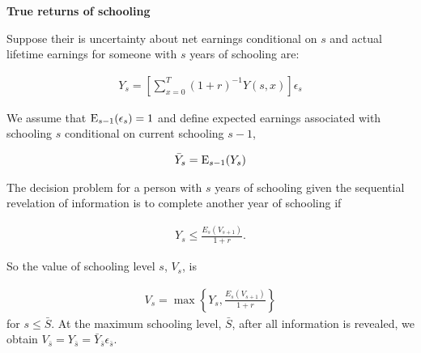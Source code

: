 \begin{frame}\begin{center}
		\LARGE\textbf{True returns of schooling}
\end{center}\end{frame}
\begin{frame}
Suppose their is uncertainty about net earnings conditional on $s$ and actual lifetime earnings for someone with $s$ years of schooling are:

\begin{align*}
Y_s = \left[\sum^T_{x = 0}(1 + r)^{-1} Y(s, x)\right]\epsilon_s
\end{align*}
\end{frame}
\begin{frame}
We assume that $\mathrm{E}_{s - 1}(\epsilon_s) = 1$ and define expected earnings associated with schooling $s$ conditional on current schooling $s - 1$,

\begin{align*}
\bar{Y}_s = \mathrm{E}_{s - 1}(Y_s)
\end{align*}
\end{frame}
\begin{frame}
The decision problem for a person with $s$ years of schooling given the sequential revelation of information is to complete another year of schooling if

\begin{align*}
Y_s \leq \frac{E_s(V_{s+1})}{1 + r}.
\end{align*}

\end{frame}
\begin{frame}
So the value of schooling level $s$, $V_s$, is

\begin{align*}
V_s = \max\left\{Y_s, \frac{E_s(V_{s+1})}{1 + r}\right\}
\end{align*}
for $s \leq \bar{S}$. At the maximum schooling level, $\bar{S}$, after all information is revealed, we obtain $V_{\bar{s}} = Y_{\bar{s}} = \bar{Y}_{\bar{s}}\epsilon_{\bar{s}}$.

\end{frame}
